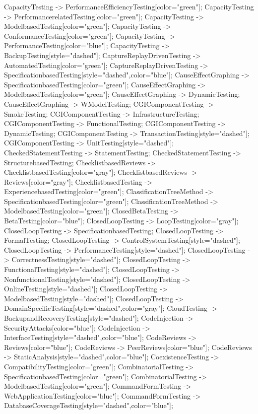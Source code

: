 \documentclass{article}
\begin{document}
{CapacityTesting -> PerformanceEfficiencyTesting[color="green"];
CapacityTesting -> PerformancerelatedTesting[color="green"];
CapacityTesting -> ModelbasedTesting[color="green"];
CapacityTesting -> ConformanceTesting[color="green"];
CapacityTesting -> PerformanceTesting[color="blue"];
CapacityTesting -> BackupTesting[style="dashed"];
CaptureReplayDrivenTesting -> AutomatedTesting[color="green"];
CaptureReplayDrivenTesting -> SpecificationbasedTesting[style="dashed",color="blue"];
CauseEffectGraphing -> SpecificationbasedTesting[color="green"];
CauseEffectGraphing -> ModelbasedTesting[color="green"];
CauseEffectGraphing -> DynamicTesting;
CauseEffectGraphing -> WModelTesting;
CGIComponentTesting -> SmokeTesting;
CGIComponentTesting -> InfrastructureTesting;
CGIComponentTesting -> FunctionalTesting;
CGIComponentTesting -> DynamicTesting;
CGIComponentTesting -> TransactionTesting[style="dashed"];
CGIComponentTesting -> UnitTesting[style="dashed"];
CheckedStatementTesting -> StatementTesting;
CheckedStatementTesting -> StructurebasedTesting;
ChecklistbasedReviews -> ChecklistbasedTesting[color="gray"];
ChecklistbasedReviews -> Reviews[color="gray"];
ChecklistbasedTesting -> ExperiencebasedTesting[color="green"];
ClassificationTreeMethod -> SpecificationbasedTesting[color="green"];
ClassificationTreeMethod -> ModelbasedTesting[color="green"];
ClosedBetaTesting -> BetaTesting[color="blue"];
ClosedLoopTesting -> LoopTesting[color="gray"];
ClosedLoopTesting -> SpecificationbasedTesting;
ClosedLoopTesting -> FormalTesting;
ClosedLoopTesting -> ControlSystemTesting[style="dashed"];
ClosedLoopTesting -> PerformanceTesting[style="dashed"];
ClosedLoopTesting -> CorrectnessTesting[style="dashed"];
ClosedLoopTesting -> FunctionalTesting[style="dashed"];
ClosedLoopTesting -> NonfunctionalTesting[style="dashed"];
ClosedLoopTesting -> OnlineTesting[style="dashed"];
ClosedLoopTesting -> ModelbasedTesting[style="dashed"];
ClosedLoopTesting -> DomainSpecificTesting[style="dashed",color="gray"];
CloudTesting -> BackupandRecoveryTesting[style="dashed"];
CodeInjection -> SecurityAttacks[color="blue"];
CodeInjection -> InterfaceTesting[style="dashed",color="blue"];
CodeReviews -> Reviews[color="blue"];
CodeReviews -> PeerReviews[color="blue"];
CodeReviews -> StaticAnalysis[style="dashed",color="blue"];
CoexistenceTesting -> CompatibilityTesting[color="green"];
CombinatorialTesting -> SpecificationbasedTesting[color="green"];
CombinatorialTesting -> ModelbasedTesting[color="green"];
CommandFormTesting -> WebApplicationTesting[color="blue"];
CommandFormTesting -> DatabaseCoverageTesting[style="dashed",color="blue"];
}
\end{document}
